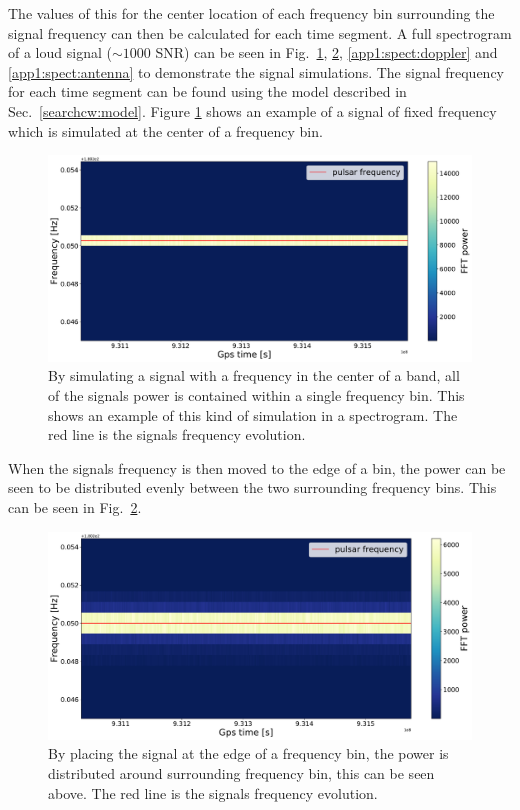 The values of this for the center location of each frequency bin surrounding the signal frequency can then be calculated for each time segment. 
A full spectrogram of a loud signal ($\sim 1000$ \gls{SNR}) can be seen in Fig.~\ref{app1:spect:centerbin}, \ref{app1:spect:edgebin}, \ref{app1:spect:doppler} and \ref{app1:spect:antenna} to demonstrate the signal simulations.
The signal frequency for each time segment can be found using the model described in Sec.~\ref{searchcw:model}.
Figure \ref{app1:spect:centerbin} shows an example of a signal of fixed frequency which is simulated at the center of a frequency bin.
\begin{figure}[ht]
	\centering
	\includegraphics[width=\linewidth]{AppendixA/centerbin_nodop_noant.pdf}
	\caption[Generated spectrogram in center of frequency bin.]{By simulating a signal with a frequency in the center of a band, all of the signals power is contained within a single frequency bin. This shows an example of this kind of simulation in a spectrogram. The red line is the signals frequency evolution.}
	\label{app1:spect:centerbin}
\end{figure}
When the signals frequency is then moved to the edge of a bin, the power can be seen to be distributed evenly between the two surrounding frequency bins. This can be seen in Fig.~\ref{app1:spect:edgebin}.
\begin{figure}[ht]
	\centering
	\includegraphics[width=\linewidth]{AppendixA/edgebin_nodop_noant.pdf}
	\caption[Generated spectrogram at edge of frequency bin.]{By placing the signal at the edge of a frequency bin, the power is distributed around surrounding frequency bin, this can be seen above. The red line is the signals frequency evolution.}
	\label{app1:spect:edgebin}
\end{figure}
